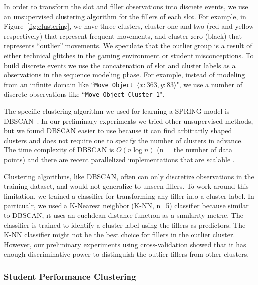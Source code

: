 \documentclass{sigchi}
\def\algname{SPRING\xspace}
\begin{document}
In order to transform the slot and filler observations into discrete events, we use an unsupervised clustering algorithm for the fillers of each slot.
For example, in Figure~\ref{fig:clustering}, we have three clusters,  cluster one and two (red and yellow respectively) that represent frequent movements, and cluster zero (black) that represents ``outlier'' movements.
We speculate that the outlier group is a result of either technical glitches in the gaming environment or student misconceptions.
To build discrete events we use the  concatenation of slot and cluster labels as a  observations in the sequence modeling phase.
For example, instead of modeling from an infinite  domain like ``\texttt{Move Object $\langle x:363, y:83 \rangle$}",
we use a number of discrete observations like ``\texttt{Move Object Cluster 1}".

The specific clustering algorithm we used  for learning a \algname model is DBSCAN~\cite{ester1996density}.
In our preliminary experiments we tried other unsupervised methods, but  we found DBSCAN easier to use because it can find arbitrarily shaped clusters and does not require one to specify the number of clusters in advance.
The time complexity of DBSCAN is $O(n \log n)$ (n = the number of data points) and there are recent parallelized implementations that are scalable \cite{patwary2012new,dai2012efficient}.

Clustering algorithms, like DBSCAN, often can only discretize observations in the training dataset, and would not generalize to unseen fillers.
To work around this limitation, we trained a classifier for transforming any filler into a cluster label. 
In particualr, we used a K-Nearest neighbor (K-NN, n=5) classifier because similar to DBSCAN, it uses an euclidean distance function as a similarity metric.
The classifier is trained to identify a cluster label using the fillers as predictors.
The K-NN classifier might not be the best choice for fillers in the outlier cluster. 
However, our preliminary experiments using cross-validation showed that it has enough discriminative power to distinguish the outlier fillers from other clusters.


\subsubsection{Student Performance Clustering}
\label{sec:student_disc}
\end{document}
